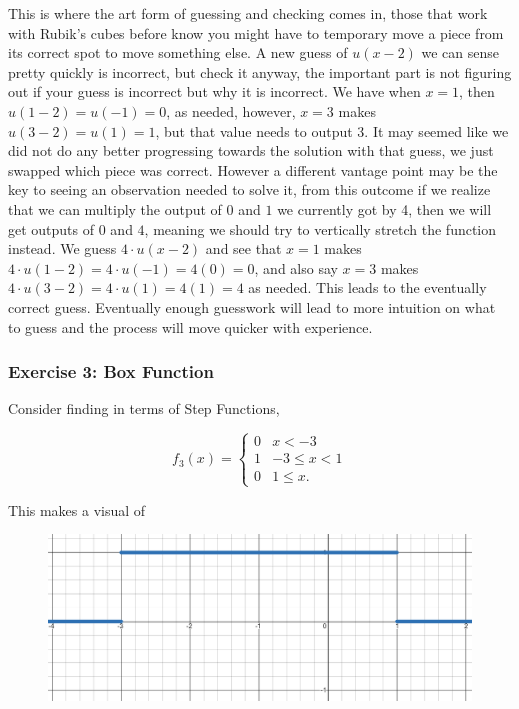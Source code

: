 \documentclass[12pt]{article}
\begin{document}
This is where the art form of guessing and checking comes in, those that work with Rubik's cubes before know you might have to temporary move a piece from its correct spot to move something else. A new guess of $u(x-2)$ we can sense pretty quickly is incorrect, but check it anyway, the important part is not figuring out if your guess is incorrect but why it is incorrect. We have when $x=1$, then $u(1-2)=u(-1)=0$, as needed, however, $x=3$ makes $u(3-2)=u(1)=1$, but that value needs to output 3. It may seemed like we did not do any better progressing towards the solution with that guess, we just swapped which piece was correct. However a different vantage point may be the key to seeing an observation needed to solve it, from this outcome if we realize that we can multiply the output of $0$ and $1$ we currently got by 4, then we will get outputs of $0$ and $4$, meaning we should try to vertically stretch the function instead. We guess $4\cdot u(x-2)$ and see that $x=1$ makes $4\cdot u(1-2)=4\cdot u(-1)=4(0)=0$, and also say $x=3$ makes $4\cdot u(3-2)=4\cdot u(1)=4(1)=4$ as needed. This leads to the eventually correct guess. Eventually enough guesswork will lead to more intuition on what to guess and the process will move quicker with experience. \\

\subsubsection{Exercise 3: Box Function}

Consider finding in terms of Step Functions,

\begin{equation*}
    f_3(x)=\left\{
        \begin{array}{rl}
            0 & x < -3  \\
            1 & -3 \leq x < 1 \\
            0 & 1 \leq x. 
        \end{array}
    \right.
\end{equation*}

This makes a visual of

\begin{figure}[!htbp]
\centering
\includegraphics[scale=.4]{step3.PNG}
\label{fig:hsf3}
\end{figure}
\end{document}
